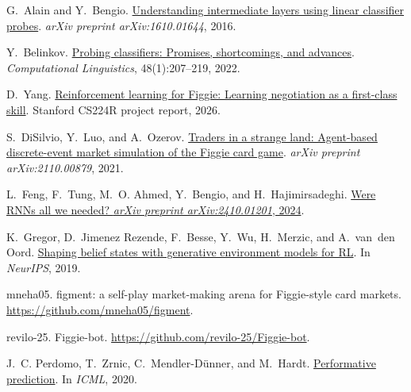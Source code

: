 \documentclass{article}
\begin{document}
\small
\newcommand{\reftitle}[2]{\href{#1}{\color{black}#2}}
\begin{thebibliography}{20}\setlength{\itemsep}{1pt}\setlength{\parsep}{0pt}

G.~Alain and Y.~Bengio.
\newblock \reftitle{https://arxiv.org/abs/1610.01644}{Understanding intermediate layers using linear classifier probes}.
\newblock \emph{arXiv preprint arXiv:1610.01644}, 2016.

Y.~Belinkov.
\newblock \reftitle{https://doi.org/10.1162/coli_a_00422}{Probing classifiers: Promises, shortcomings, and advances}.
\newblock \emph{Computational Linguistics}, 48(1):207--219, 2022.

D.~Yang.
\newblock \reftitle{https://cs224r.stanford.edu/projects/pdfs/Daniel\%20Li\%20Yang\%20submission_416100137/CS224R_Project_Report-5.pdf}{Reinforcement learning for Figgie: Learning negotiation as a first-class skill}.
\newblock Stanford CS224R project report, 2026.

S.~DiSilvio, Y.~Luo, and A.~Ozerov.
\newblock \reftitle{https://arxiv.org/abs/2110.00879}{Traders in a strange land: Agent-based discrete-event market simulation of the Figgie card game}.
\newblock \emph{arXiv preprint arXiv:2110.00879}, 2021.

L.~Feng, F.~Tung, M.~O. Ahmed, Y.~Bengio, and H.~Hajimirsadeghi.
\newblock \reftitle{https://arxiv.org/abs/2410.01201}{Were RNNs all we needed?
\newblock \emph{arXiv preprint arXiv:2410.01201}, 2024}.

K.~Gregor, D.~Jimenez Rezende, F.~Besse, Y.~Wu, H.~Merzic, and A.~van~den Oord.
\newblock \reftitle{https://arxiv.org/abs/1906.09237}{Shaping belief states with generative environment models for RL}.
\newblock In \emph{NeurIPS}, 2019.

 mneha05.
\newblock figment: a self-play market-making arena for Figgie-style card markets.
\newblock \url{https://github.com/mneha05/figment}.

 revilo-25.
\newblock Figgie-bot.
\newblock \url{https://github.com/revilo-25/Figgie-bot}.

J.~C. Perdomo, T.~Zrnic, C.~Mendler-D\"unner, and M.~Hardt.
\newblock \reftitle{https://arxiv.org/abs/2002.06673}{Performative prediction}.
\newblock In {\em ICML}, 2020.


\end{thebibliography}
\end{document}
